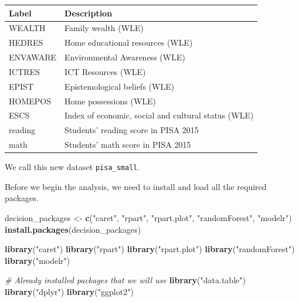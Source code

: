 \documentclass[]{book}
\newenvironment{Shaded}{\begin{snugshade}}{\end{snugshade}}
\newcommand{\CommentTok}[1]{\textcolor[rgb]{0.56,0.35,0.01}{\textit{#1}}}
\newcommand{\DataTypeTok}[1]{\textcolor[rgb]{0.13,0.29,0.53}{#1}}
\newcommand{\KeywordTok}[1]{\textcolor[rgb]{0.13,0.29,0.53}{\textbf{#1}}}
\newcommand{\NormalTok}[1]{#1}
\newcommand{\OperatorTok}[1]{\textcolor[rgb]{0.81,0.36,0.00}{\textbf{#1}}}
\newcommand{\StringTok}[1]{\textcolor[rgb]{0.31,0.60,0.02}{#1}}
\begin{document}
\begin{longtable}[]{@{}ll@{}}
\toprule
Label & Description\tabularnewline
\midrule
\endhead
WEALTH & Family wealth (WLE)\tabularnewline
HEDRES & Home educational resources (WLE)\tabularnewline
ENVAWARE & Environmental Awareness (WLE)\tabularnewline
ICTRES & ICT Resources (WLE)\tabularnewline
EPIST & Epistemological beliefs (WLE)\tabularnewline
HOMEPOS & Home possessions (WLE)\tabularnewline
ESCS & Index of economic, social and cultural status (WLE)\tabularnewline
reading & Students' reading score in PISA 2015\tabularnewline
math & Students' math score in PISA 2015\tabularnewline
\bottomrule
\end{longtable}

We call this new dataset \texttt{pisa\_small}.

\begin{Shaded}
\end{Shaded}

Before we begin the analysis, we need to install and load all the required packages.

\begin{Shaded}
\begin{Highlighting}[]
\NormalTok{decision_packages <-}\StringTok{ }\KeywordTok{c}\NormalTok{(}\StringTok{"caret"}\NormalTok{, }\StringTok{"rpart"}\NormalTok{, }\StringTok{"rpart.plot"}\NormalTok{, }\StringTok{"randomForest"}\NormalTok{, }\StringTok{"modelr"}\NormalTok{)}
\KeywordTok{install.packages}\NormalTok{(decision_packages)}

\KeywordTok{library}\NormalTok{(}\StringTok{"caret"}\NormalTok{)}
\KeywordTok{library}\NormalTok{(}\StringTok{"rpart"}\NormalTok{)}
\KeywordTok{library}\NormalTok{(}\StringTok{"rpart.plot"}\NormalTok{)}
\KeywordTok{library}\NormalTok{(}\StringTok{"randomForest"}\NormalTok{)}
\KeywordTok{library}\NormalTok{(}\StringTok{"modelr"}\NormalTok{)}

\CommentTok{# Already installed packages that we will use}
\KeywordTok{library}\NormalTok{(}\StringTok{"data.table"}\NormalTok{)}
\KeywordTok{library}\NormalTok{(}\StringTok{"dplyr"}\NormalTok{)}
\KeywordTok{library}\NormalTok{(}\StringTok{"ggplot2"}\NormalTok{)}
\end{Highlighting}
\end{Shaded}
\end{document}
